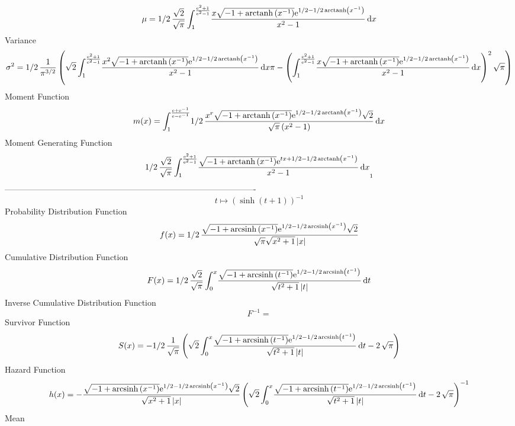 \documentclass[12pt]{article}
\begin{document}
 $$ \mu=1/2\,{\frac {\sqrt {2}}{\sqrt {\pi}}\int_{1}^{{\frac {{{\rm e}^{2}}+1
}{{{\rm e}^{2}}-1}}}\!{\frac {x\sqrt {-1+{\rm arctanh} \left({x}^{-1}
\right)}{{\rm e}^{1/2-1/2\,{\rm arctanh} \left({x}^{-1}\right)}}}{{x}^
{2}-1}}\,{\rm d}x}
$$ Variance 
 $$ \sigma^2 = 1/2\,{\frac {1}{{\pi}^{3/2}} \left( \sqrt {2}\int_{1}^{{\frac {{
{\rm e}^{2}}+1}{{{\rm e}^{2}}-1}}}\!{\frac {{x}^{2}\sqrt {-1+
{\rm arctanh} \left({x}^{-1}\right)}{{\rm e}^{1/2-1/2\,{\rm arctanh} 
\left({x}^{-1}\right)}}}{{x}^{2}-1}}\,{\rm d}x\pi- \left( \int_{1}^{{
\frac {{{\rm e}^{2}}+1}{{{\rm e}^{2}}-1}}}\!{\frac {x\sqrt {-1+
{\rm arctanh} \left({x}^{-1}\right)}{{\rm e}^{1/2-1/2\,{\rm arctanh} 
\left({x}^{-1}\right)}}}{{x}^{2}-1}}\,{\rm d}x \right) ^{2}\sqrt {\pi}
 \right) }
$$Moment Function 
 $$ m(x) = \int_{1}^{{\frac {{\rm e}+{{\rm e}^{-1}}}{{\rm e}-{{\rm e}^{-1}}}}}\!1
/2\,{\frac {{x}^{r}\sqrt {-1+{\rm arctanh} \left({x}^{-1}\right)}{
{\rm e}^{1/2-1/2\,{\rm arctanh} \left({x}^{-1}\right)}}\sqrt {2}}{
\sqrt {\pi} \left( {x}^{2}-1 \right) }}\,{\rm d}x
$$ Moment Generating Function 
 $$1/2\,{\frac {\sqrt {2}}{\sqrt {\pi}}\int_{1}^{{\frac {{{\rm e}^{2}}+1
}{{{\rm e}^{2}}-1}}}\!{\frac {\sqrt {-1+{\rm arctanh} \left({x}^{-1}
\right)}{{\rm e}^{tx+1/2-1/2\,{\rm arctanh} \left({x}^{-1}\right)}}}{{
x}^{2}-1}}\,{\rm d}x}_{{1}}
$$-------------------------------------------------------------------------------------------  \\$$t\mapsto  \left( \sinh \left( t+1 \right)  \right) ^{-1}
$$Probability Distribution Function 
$$  f(x)=1/2\,{\frac {\sqrt {-1+{\rm arcsinh} \left({x}^{-1}\right)}{{\rm e}^{1
/2-1/2\,{\rm arcsinh} \left({x}^{-1}\right)}}\sqrt {2}}{\sqrt {\pi}
\sqrt {{x}^{2}+1} \left| x \right| }}
$$Cumulative Distribution Function  
 $$F(x)=1/2\,{\frac {\sqrt {2}}{\sqrt {\pi}}\int_{0}^{x}\!{\frac {\sqrt {-1+
{\rm arcsinh} \left({t}^{-1}\right)}{{\rm e}^{1/2-1/2\,{\rm arcsinh} 
\left({t}^{-1}\right)}}}{\sqrt {{t}^{2}+1} \left| t \right| }}
\,{\rm d}t}
$$ Inverse Cumulative Distribution Function 
  $$F^{-1} = $$Survivor Function 
 $$ S(x)=-1/2\,{\frac {1}{\sqrt {\pi}} \left( \sqrt {2}\int_{0}^{x}\!{\frac {
\sqrt {-1+{\rm arcsinh} \left({t}^{-1}\right)}{{\rm e}^{1/2-1/2\,
{\rm arcsinh} \left({t}^{-1}\right)}}}{\sqrt {{t}^{2}+1} \left| t
 \right| }}\,{\rm d}t-2\,\sqrt {\pi} \right) }
$$ Hazard Function 
 $$ h(x)=-{\frac {\sqrt {-1+{\rm arcsinh} \left({x}^{-1}\right)}{{\rm e}^{1/2-1
/2\,{\rm arcsinh} \left({x}^{-1}\right)}}\sqrt {2}}{\sqrt {{x}^{2}+1}
 \left| x \right| } \left( \sqrt {2}\int_{0}^{x}\!{\frac {\sqrt {-1+
{\rm arcsinh} \left({t}^{-1}\right)}{{\rm e}^{1/2-1/2\,{\rm arcsinh} 
\left({t}^{-1}\right)}}}{\sqrt {{t}^{2}+1} \left| t \right| }}
\,{\rm d}t-2\,\sqrt {\pi} \right) ^{-1}}
$$Mean 
\end{document}
